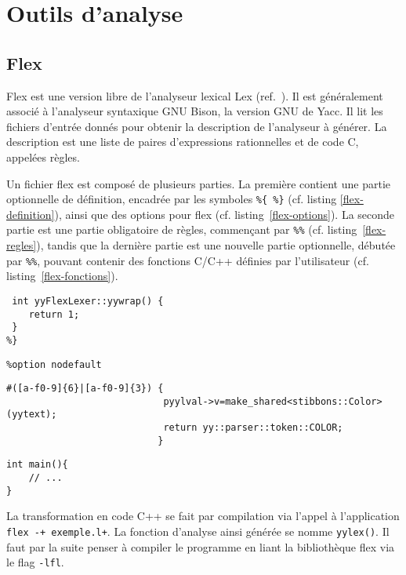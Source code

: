\section{Outils d'analyse}

\subsection{Flex}
\label{Flex}

Flex est une version libre de l'analyseur lexical Lex (ref.~\cite{flex}). Il est généralement associé à l'analyseur syntaxique GNU Bison, la version GNU de Yacc.
Il lit les fichiers d'entrée donnés pour obtenir la description de l'analyseur à générer. La description est une liste de paires d'expressions rationnelles et de code C, appelées règles. 

Un fichier flex est composé de plusieurs parties. La première contient une partie optionnelle de définition, encadrée par les symboles \verb|%{ %}| (cf. listing \ref{flex-definition}), ainsi que des options pour flex (cf. listing~\ref{flex-options}). La seconde partie est une partie obligatoire de règles, commençant par \verb|%%| (cf. listing~\ref{flex-regles}), tandis que la dernière partie est une nouvelle partie optionnelle, débutée par \verb|%%|, pouvant contenir des fonctions C/C++ définies par l'utilisateur (cf. listing~\ref{flex-fonctions}).

\begin{lstlisting}[caption=Partie définition d'un fichier flex,label=flex-definition]
%{
 int yyFlexLexer::yywrap() {
	return 1;
 }
%}
\end{lstlisting}

\begin{lstlisting}[caption=Options flex,label=flex-options]
%option c++ 
%option nodefault 
\end{lstlisting}

\begin{lstlisting}[label=flex-regles,caption=Partie règles de flex]
%%
#([a-f0-9]{6}|[a-f0-9]{3}) {
							pyylval->v=make_shared<stibbons::Color>(yytext); 
							return yy::parser::token::COLOR;
						   }
\end{lstlisting}
\begin{lstlisting}[label=flex-fonctions,caption=Partie fonctions de flex]
%%
int main(){
	// ...
}
\end{lstlisting}

La transformation en code C++ se fait par compilation via l'appel à l'application \verb|flex -+ exemple.l+|. La fonction d'analyse ainsi générée se nomme \verb|yylex()|.
Il faut par la suite penser à compiler le programme en liant la bibliothèque flex via le flag \verb|-lfl|.

